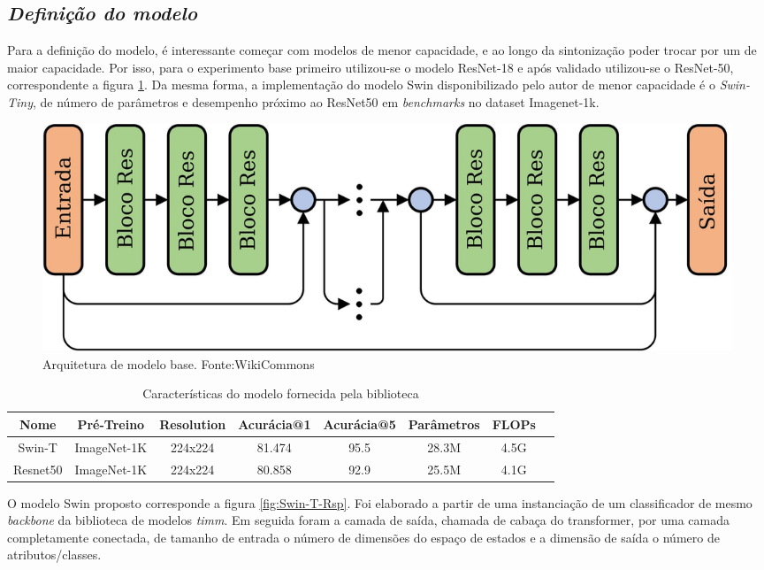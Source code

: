 \subsection{\textit{Definição do modelo}}\label{sec:Cap3_Def_modelo}


Para a definição do modelo, é interessante começar com modelos de menor capacidade, e ao longo da sintonização poder trocar por um de maior capacidade. Por isso, para o experimento base primeiro utilizou-se o modelo ResNet-18 e após validado utilizou-se o ResNet-50, correspondente a figura \ref{fig:ResNet-Rsp}. Da mesma forma, a implementação do modelo Swin disponibilizado pelo autor de menor capacidade é o \textit{Swin-Tiny}, de número de parâmetros e desempenho próximo ao ResNet50 em \textit{benchmarks} no dataset Imagenet-1k.

\begin{figure}[!ht]
    \centering
    \includegraphics[width=0.9\columnwidth]{Imagens/An-illustration-of-the-deep-residual-network-ResNet-structure-More-shortcut.jpg}
    \caption{ Arquitetura de modelo base. Fonte:WikiCommons}
   \label{fig:ResNet-Rsp}
\end{figure}


\begin{table}[h!]
    \caption{Características do modelo fornecida pela biblioteca } 
    \centering
\begin{tabular}{*{8}{c}}
    \toprule
    Nome & Pré-Treino & Resolution & Acurácia@1 & Acurácia@5 &  Parâmetros & FLOPs \\
    \midrule
    Swin-T & ImageNet-1K & 224x224 & 81.474 & 95.5 &	28.3M &	4.5G \\
    Resnet50 & ImageNet-1K & 224x224 &	80.858 & 92.9 &	25.5M &	4.1G \\
    \bottomrule
\end{tabular}
\label{tab:especificacao_modelos}
\end{table}


O modelo Swin proposto corresponde a figura \ref{fig:Swin-T-Rsp}. Foi elaborado a partir de uma instanciação de um classificador de mesmo \textit{backbone} da biblioteca de modelos \textit{timm}. Em seguida foram a camada de saída, chamada de cabaça do transformer, por uma camada completamente conectada, de tamanho de entrada o número de dimensões do espaço de estados e a dimensão de saída o número de atributos/classes.

